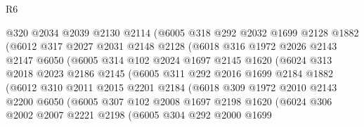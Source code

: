 \begin{lexlean}{R6}
\begin{coremodule}
                  @320
                  @2034
                  @2039
                  @2130
                  @2114
                  (@6005
                    @318
                    @292
                    @2032
                    @1699
                    @2128
                    @1882
                    (@6012
                      @317
                      @2027
                      @2031
                      @2148
                      @2128
                      (@6018
                        @316
                        @1972
                        @2026
                        @2143
                        @2147
                        @6050
                        (@6005
                          @314
                          @102
                          @2024
                          @1697
                          @2145
                          @1620
                          (@6024
                            @313
                            @2018
                            @2023
                            @2186
                            @2145
                            (@6005
                              @311
                              @292
                              @2016
                              @1699
                              @2184
                              @1882
                              (@6012
                                @310
                                @2011
                                @2015
                                @2201
                                @2184
                                (@6018
                                  @309
                                  @1972
                                  @2010
                                  @2143
                                  @2200
                                  @6050
                                  (@6005
                                    @307
                                    @102
                                    @2008
                                    @1697
                                    @2198
                                    @1620
                                    (@6024
                                      @306
                                      @2002
                                      @2007
                                      @2221
                                      @2198
                                      (@6005
                                        @304
                                        @292
                                        @2000
                                        @1699

\end{coremodule}
\end{lexlean}
